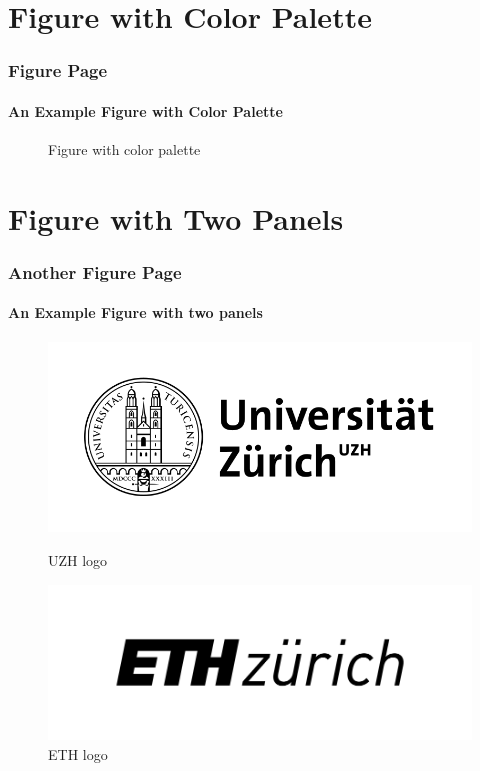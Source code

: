 \documentclass[10pt]{beamer}
\begin{document}
\section{Figure with Color Palette}
\begin{frame}
\frametitle{Figure Page}
\framesubtitle{An Example Figure with Color Palette}
\begin{figure}
\centering

\caption{Figure with color palette}

\end{figure}
\end{frame}


\section{Figure with Two Panels}
\begin{frame}
\frametitle{Another Figure Page}
\framesubtitle{An Example Figure with two panels}
\begin{figure}
\centering
\begin{minipage}[b]{0.45\textwidth}
\includegraphics[width=\linewidth]{UZH-logo.png}
\caption{UZH logo}
\end{minipage}
\begin{minipage}[b]{0.45\textwidth}
\includegraphics[width=\linewidth]{ETH-logo.png}
\caption{ETH logo}
\end{minipage}
\end{figure}
\end{frame}
\end{document}
